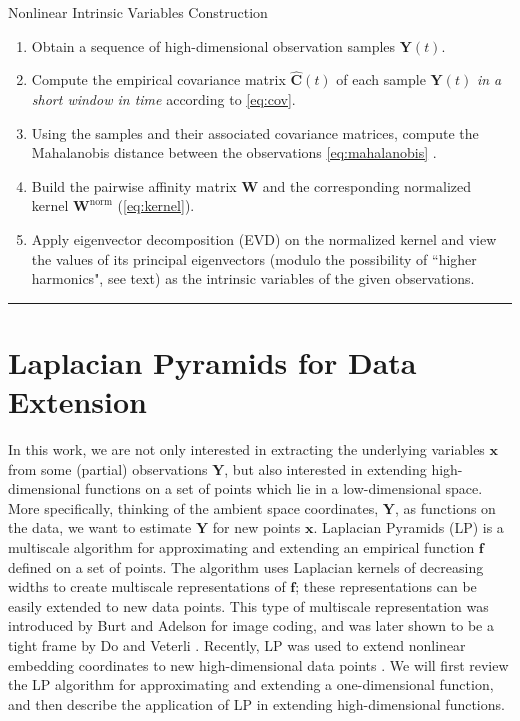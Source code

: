 \documentclass[aip,jcp,preprint]{revtex4-1}
\begin{document}
\begin{algorithm}[th!]
\caption{Nonlinear Intrinsic Variables Construction}
\begin{enumerate}

\item
Obtain a sequence of high-dimensional observation samples $\mathbf{Y}(t)$.

\item
Compute the empirical covariance matrix $\widehat{\mathbf{C}}(t)$ of each sample $\mathbf{Y}(t)$ {\em in a short window in time} according to \eqref{eq:cov}.

\item
Using the samples and their associated covariance matrices, compute the Mahalanobis distance between the observations \eqref{eq:mahalanobis} .

\item
Build the pairwise affinity matrix $\mathbf{W}$ and the corresponding normalized kernel $\mathbf{W}^{\mathrm{norm}}$ (\ref{eq:kernel}).

\item
Apply eigenvector decomposition (EVD) on the normalized kernel and view the values of its principal eigenvectors (modulo the possibility of
 ``higher harmonics", see text) as the intrinsic variables of the given observations.

\end{enumerate}
\hrule
\label{algo}
\end{algorithm}

\section{Laplacian Pyramids for Data Extension} \label{sec:LapPyr}

In this work, we are not only interested in extracting the underlying variables $\mathbf{x}$ from some (partial) observations $\mathbf{Y}$,
but also interested in extending high-dimensional functions on a set of points which lie in a low-dimensional space.
%
More specifically, thinking of the ambient space coordinates, $\mathbf{Y}$, as functions on the data,
we want to estimate $\mathbf{Y}$ for new points $\mathbf{x}$.
%
Laplacian Pyramids (LP) is a multiscale algorithm for approximating and extending an empirical function $\mathbf{f}$ defined on a set of points.
%
The algorithm uses Laplacian kernels of decreasing widths to create multiscale representations of $\mathbf{f}$;
these representations can be easily extended to new data points.
%
This type of multiscale representation was introduced by Burt and Adelson \cite{burt1983laplacian} for image coding,
and was later shown to be a tight frame by Do and Veterli \cite{do2003framing}.
%
Recently, LP was used to extend nonlinear embedding coordinates to new high-dimensional data points \cite{rabin2012heterogeneous}.
%
%
We will first review the LP algorithm for approximating and extending a one-dimensional function,
and then describe the application of LP in extending high-dimensional functions.
\end{document}
